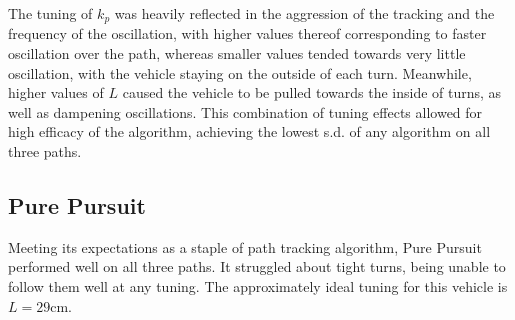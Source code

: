 \documentclass[mla7]{mla}
\begin{document}
\begin{paper}
\begin{figure}[H]
\endminipage
\end{figure}

The tuning of $k_p$ was heavily reflected in the aggression of the tracking and the frequency of the oscillation, with higher values thereof corresponding to faster oscillation over the path, whereas smaller values tended towards very little oscillation, with the vehicle staying on the outside of each turn. Meanwhile, higher values of $L$ caused the vehicle to be pulled towards the inside of turns, as well as dampening oscillations. This combination of tuning effects allowed for high efficacy of the algorithm, achieving the lowest s.d. of any algorithm on all three paths.

\subsection{Pure Pursuit}

Meeting its expectations as a staple of path tracking algorithm, Pure Pursuit performed well on all three paths. It struggled about tight turns, being unable to follow them well at any tuning. The approximately ideal tuning for this vehicle is $L=29$cm.


\end{paper}
\end{document}
